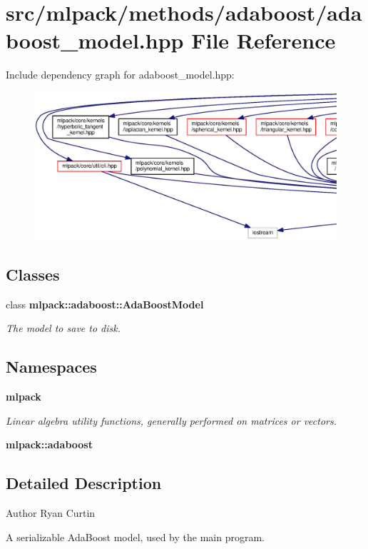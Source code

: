 \section{src/mlpack/methods/adaboost/adaboost\+\_\+model.hpp File Reference}
\label{adaboost__model_8hpp}
Include dependency graph for adaboost\+\_\+model.\+hpp\+:
\nopagebreak
\begin{figure}[H]
\begin{center}
\leavevmode
\includegraphics[width=350pt]{adaboost__model_8hpp__incl}
\end{center}
\end{figure}
\subsection*{Classes}
\begin{DoxyCompactItemize}
\item 
class {\bf mlpack\+::adaboost\+::\+Ada\+Boost\+Model}
\begin{DoxyCompactList}\small\item\em The model to save to disk. \end{DoxyCompactList}\end{DoxyCompactItemize}
\subsection*{Namespaces}
\begin{DoxyCompactItemize}
\item 
 {\bf mlpack}
\begin{DoxyCompactList}\small\item\em Linear algebra utility functions, generally performed on matrices or vectors. \end{DoxyCompactList}\item 
 {\bf mlpack\+::adaboost}
\end{DoxyCompactItemize}


\subsection{Detailed Description}
\begin{DoxyAuthor}{Author}
Ryan Curtin
\end{DoxyAuthor}
A serializable Ada\+Boost model, used by the main program. 